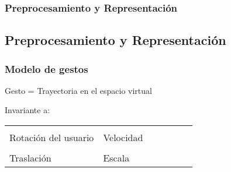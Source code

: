 %
%
%
%

\begin{myframe}

\frametitle{Preprocesamiento y Representación}
\end{myframe}

\subsection{Preprocesamiento y Representación}

\begin{myframe}
\frametitle{Modelo de gestos}
\centering
\begin{block}{}
\centering
Gesto = Trayectoria en el espacio virtual
\end{block}
Invariante a:

\begin{tabular}{C{0.5\linewidth}C{0.5\linewidth}}


   &        
   \\
    Rotación del usuario & Velocidad \\
   &
   \\
   Traslación & Escala 
\end{tabular}

\end{myframe}



